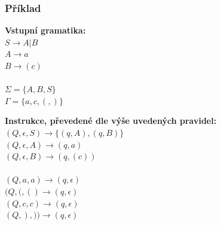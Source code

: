 \subsubsection*{Příklad}
\begin{minipage}[t]{0.35\textwidth}
\textbf{Vstupní gramatika:}\\
$S \rightarrow A | B$\\
$A \rightarrow a$\\
$B \rightarrow (c)$\\\smallskip\\
$\Sigma = \{A, B, S\}$\\
$\Gamma = \{a, c, (, )\}$
\end{minipage}
\begin{minipage}[t]{0.65\textwidth}
\textbf{Instrukce, převedené dle výše uvedených pravidel:}\\
$(Q, \epsilon, S) \rightarrow \{(q, A), (q, B)\}$\\
$(Q, \epsilon, A) \rightarrow (q, a)$\\
$(Q, \epsilon, B) \rightarrow (q, (c))$\\\smallskip\\
$(Q, a, a) \rightarrow (q, \epsilon)$\\
$(Q, (, () \rightarrow (q, \epsilon)$\\
$(Q, c, c) \rightarrow (q, \epsilon)$\\
$(Q, ), )) \rightarrow (q, \epsilon)$\\
\end{minipage}